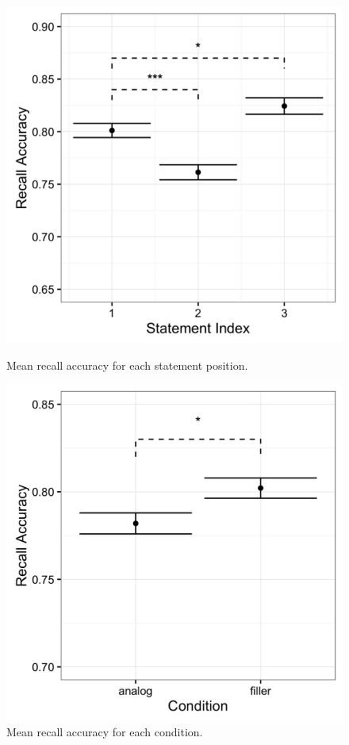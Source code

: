 \documentclass[a4paper,man,natbib,floatsintext,import]{apa6}
\begin{document}
\begin{figure}
\begin{minipage}[t]{.5\textwidth}
\includegraphics[width=.9\linewidth]{figures/conf_statIdx.png}
\caption{Mean recall accuracy for each statement position.}
\label{fig:conf_statIdx}
\end{minipage}
\begin{minipage}[t]{.5\textwidth}
\includegraphics[width=.9\linewidth]{figures/conf_condition.png}
\caption{Mean recall accuracy for each condition.}
\label{fig:conf_condition}
\end{minipage}
\end{figure}
\end{document}
